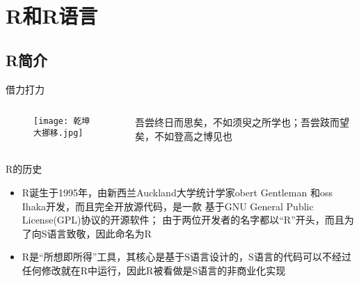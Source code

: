 
\section{R和R语言}
\subsection{R简介}
\begin{frame}{借力打力}{}

  \begin{columns}
    \begin{column}{.5\textwidth}
      \begin{figure}
        \centering \texttt{[image: 乾坤大挪移.jpg]}
      \end{figure}
    \end{column}

    \begin{column}{.5\textwidth}
      \begin{ornamentblock}
        {吾尝终日而思矣，不如须臾之所学也；吾尝跂而望矣，不如登高之博见也\\
          }
      \end{ornamentblock}
    \end{column}
  \end{columns}
\end{frame}

\begin{frame}[t]{\subsecname}{R的历史}
\begin{itemize}
\item<1-> R诞生于1995年，由新西兰Auckland大学统计学家obert Gentleman
        和oss Ihaka开发，而且完全开放源代码，是一款
        基于GNU General Public License(GPL)协议的开源软件；
由于两位开发者的名字都以“R”开头，而且为了向S语言致敬，因此命名为R
\item<2-> R是“所想即所得”工具，其核心是基于S语言设计的，S语言的代码可以不经过
        任何修改就在R中运行，因此R被看做是S语言的非商业化实现  
\end{itemize}

\begin{overlayarea} {\textwidth}{\textheight}
    \begin{figure}\centering
      \captionsetup[subfigure]{labelformat=empty} 
       \vspace{1pt}
    \end{figure}
\end{overlayarea}

\end{frame}

